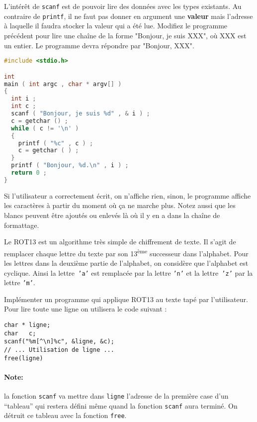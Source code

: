 \question L'intérêt de \texttt{scanf} est de pouvoir lire des données
avec les types existants. Au contraire de \texttt{printf}, il ne faut
pas donner en argument une \textbf{valeur} mais l'adresse à laquelle
il faudra stocker la valeur qui a été lue. Modifiez le programme
précédent pour lire une chaîne de la forme "Bonjour, je suis XXX", où
XXX est un entier. Le programme devra répondre par "Bonjour, XXX".

\begin{solution}
  \begin{lstlisting}[language=C]
 #include <stdio.h>

int
main ( int argc , char * argv[] )
{
  int i ;
  int c ;
  scanf ( "Bonjour, je suis %d" , & i ) ;
  c = getchar () ;
  while ( c != '\n' )
  {
    printf ( "%c" , c ) ;
    c = getchar ( ) ;
  }
  printf ( "Bonjour, %d.\n" , i ) ;
  return 0 ;
}   
  \end{lstlisting}
  Si l'utilisateur a correctement écrit, on n'affiche rien, sinon, le
  programme affiche les caractères à partir du moment où ça ne marche
  plus. Notez aussi que les blancs peuvent être ajoutés ou enlevés là
  où il y en a dans la chaîne de formattage.
\end{solution}


Le ROT13 est un algorithme très simple de chiffrement de texte.  Il
s'agit de remplacer chaque lettre du texte par son
13\textsuperscript{ème} successeur dans l'alphabet.  Pour les lettres
dans la deuxième partie de l'alphabet, on considère que l'alphabet est
cyclique.  Ainsi la lettre\texttt{ 'a'} est remplacée par la lettre
\texttt{'n'} et la lettre\texttt{ 'z'} par la lettre \texttt{'m'}.

\question Implémenter un programme qui applique ROT13 au texte tapé
par l'utilisateur. Pour lire toute une ligne on utilisera le code
suivant :
\begin{lstlisting}
char * ligne;
char   c;
scanf("%m[^\n]%c", &ligne, &c);
// ... Utilisation de ligne ...
free(ligne)
\end{lstlisting}
\paragraph{Note:} la fonction \texttt{scanf} va mettre dans
\texttt{ligne} l'adresse de la première case d'un ``tableau'' qui
restera défini même quand la fonction \texttt{scanf} aura terminé. On
détruit ce tableau avec la fonction \texttt{free}.

